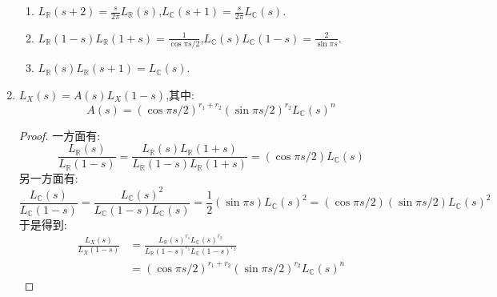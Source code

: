 \begin{enumerate}
\begin{enumerate}[(1)]
    	\item $L_{\mathbb{R}}(s+2)=\frac{s}{2\pi}L_{\mathbb{R}}(s)$,$L_{\mathbb{C}}(s+1)=\frac{s}{2\pi}L_{\mathbb{C}}(s)$.
    	\item $L_{\mathbb{R}}(1-s)L_{\mathbb{R}}(1+s)=\frac{1}{\cos\pi s/2}$,$L_{\mathbb{C}}(s)L_{\mathbb{C}}(1-s)=\frac{2}{\sin\pi s}$.
    	\item $L_{\mathbb{R}}(s)L_{\mathbb{R}}(s+1)=L_{\mathbb{C}}(s)$.
    \end{enumerate}
    \item $L_X(s)=A(s)L_X(1-s)$,其中:
    $$A(s)=(\cos\pi s/2)^{r_1+r_2}(\sin\pi s/2)^{r_2}L_{\mathbb{C}}(s)^n$$
    \begin{proof}
    	
    	一方面有:
    	$$\frac{L_{\mathbb{R}}(s)}{L_{\mathbb{R}}(1-s)}=\frac{L_{\mathbb{R}}(s)L_{\mathbb{R}}(1+s)}{L_{\mathbb{R}}(1-s)L_{\mathbb{R}}(1+s)}=(\cos\pi s/2)L_{\mathbb{C}}(s)$$
    	另一方面有:
    	$$\frac{L_{\mathbb{C}}(s)}{L_{\mathbb{C}}(1-s)}=\frac{L_{\mathbb{C}}(s)^2}{L_{\mathbb{C}}(1-s)L_{\mathbb{C}}(s)}=\frac{1}{2}(\sin\pi s)L_{\mathbb{C}}(s)^2=(\cos\pi s/2)(\sin\pi s/2)L_{\mathbb{C}}(s)^2$$
    	于是得到:
    	\begin{align*}
    		\frac{L_X(s)}{L_X(1-s)}&=\frac{L_{\mathbb{R}}(s)^{r_1}L_{\mathbb{C}}(s)^{r_2}}{L_{\mathbb{R}}(1-s)^{r_1}L_{\mathbb{C}}(1-s)^{r_2}}\\&=(\cos\pi s/2)^{r_1+r_2}(\sin\pi s/2)^{r_2}L_{\mathbb{C}}(s)^n
    	\end{align*}
    \end{proof}
\end{enumerate}
